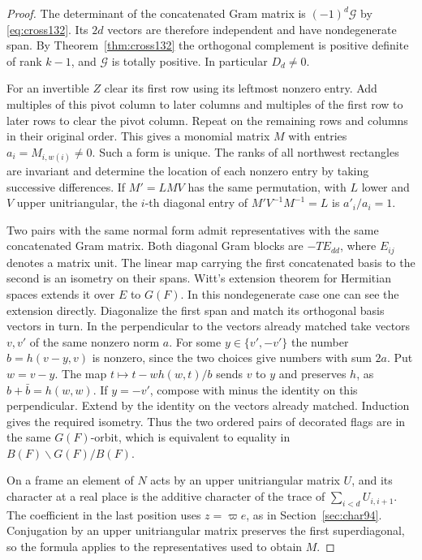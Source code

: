 \documentclass[a4paper,11pt]{article}
\theoremstyle{definition}
\theoremstyle{remark}
\numberwithin{equation}{section}
\begin{document}
\begin{proof}
The determinant of the concatenated Gram matrix is
\((-1)^d\mathcal G\) by \eqref{eq:cross132}. Its \(2d\) vectors
are therefore independent and have nondegenerate span. By
Theorem~\ref{thm:cross132} the orthogonal complement is positive
definite of rank \(k-1\), and \(\mathcal G\) is totally positive.
In particular \(D_d\ne0\).

For an invertible \(Z\) clear its first row using its leftmost
nonzero entry. Add multiples of this pivot column to later columns
and multiples of the first row to later rows to clear the pivot
column. Repeat on the remaining rows and columns in their original
order. This gives a monomial matrix \(M\) with entries
\(a_i=M_{i,w(i)}\ne0\). Such a form is unique. The ranks of all
northwest rectangles are invariant and determine the location of
each nonzero entry by taking successive differences. If
\(M'=LMV\) has the same permutation, with \(L\) lower and \(V\)
upper unitriangular, the \(i\)-th diagonal entry of
\(M'V^{-1}M^{-1}=L\) is \(a'_i/a_i=1\).

Two pairs with the same normal form admit representatives with the
same concatenated Gram matrix. Both diagonal Gram blocks are
\(-T E_{dd}\), where \(E_{ij}\) denotes a matrix unit.
The linear map carrying the first concatenated basis to the second
is an isometry on their spans. Witt's extension theorem for
Hermitian spaces extends it over \(E\) to \(G(F)\). In this
nondegenerate case one can see the extension directly. Diagonalize
the first span and match its orthogonal basis vectors in turn. In
the perpendicular to the vectors already matched take vectors
\(v,v'\) of the same nonzero norm \(a\). For some \(y\in\{v',-v'\}\)
the number \(b=h(v-y,v)\) is nonzero, since the two choices give
numbers with sum \(2a\). Put \(w=v-y\). The map
\(t\mapsto t-w h(w,t)/b\) sends \(v\) to \(y\) and preserves \(h\),
as \(b+\bar b=h(w,w)\). If \(y=-v'\), compose with minus the
identity on this perpendicular. Extend by the identity on the
vectors already matched. Induction gives the required isometry.
Thus the two ordered pairs of decorated flags are in the same
\(G(F)\)-orbit, which is equivalent to equality in
\(B(F)\backslash G(F)/B(F)\).

On a frame an element of \(N\) acts by an upper unitriangular
matrix \(U\), and its character at a real place is the additive
character of the trace of \(\sum_{i<d}U_{i,i+1}\). The coefficient
in the last position uses \(z=\varpi e\), as in Section~\ref{sec:char94}.
Conjugation by an upper unitriangular matrix preserves the first
superdiagonal, so the formula applies to the representatives used
to obtain \(M\).


\end{proof}
\end{document}
